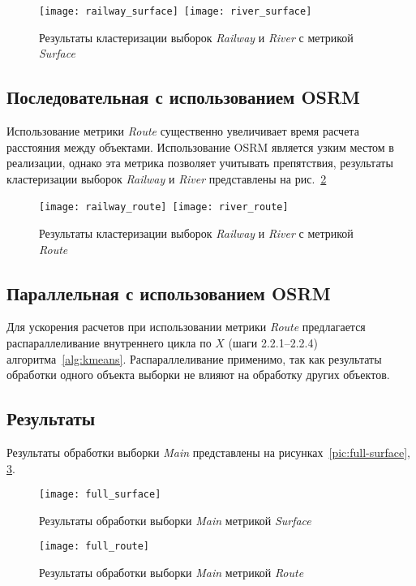 \begin{figure}[h!]
    \texttt{[image: railway\_surface]}\
    \texttt{[image: river\_surface]} \\[1ex]
    \parbox{.95\textwidth}{\caption{Результаты кластеризации выборок \emph{Railway} и \emph{River} с метрикой \emph{Surface}}\label{pic:test_surface_results}}
    \vspace*{-1ex}
\end{figure}

\subsection{Последовательная с использованием OSRM}
Использование метрики \emph{Route} существенно увеличивает время расчета расстояния между объектами. Использование OSRM является узким местом в реализации, однако эта метрика позволяет учитывать препятствия, результаты кластеризации выборок \emph{Railway} и \emph{River} представлены на рис.~\ref{pic:test_route_results}

\begin{figure}[h!]
    \texttt{[image: railway\_route]}\
    \texttt{[image: river\_route]} \\[1ex]
    \parbox{.95\textwidth}{\caption{Результаты кластеризации выборок \emph{Railway} и \emph{River} с метрикой \emph{Route}}\label{pic:test_route_results}}
    \vspace*{-1ex}
\end{figure}

\subsection{Параллельная с использованием OSRM}
Для ускорения расчетов при использовании метрики \emph{Route} предлагается распараллеливание внутреннего цикла по \( X \) (шаги 2.2.1--2.2.4) алгоритма~\ref{alg:kmeans}. Распараллеливание применимо, так как результаты обработки одного объекта выборки не влияют на обработку других объектов.

\subsection{Результаты}
Результаты обработки выборки \emph{Main} представлены на рисунках~\ref{pic:full-surface}, \ref{pic:full-route}.

\begin{figure}[h!]
    \centering
    \texttt{[image: full\_surface]}\\[1ex]
    \parbox{.95\textwidth}{\caption{Результаты обработки выборки \emph{Main} метрикой \emph{Surface}}\label{pic:full-surface}}
    \texttt{[image: full\_route]}\\[1ex]
    \parbox{.95\textwidth}{\caption{Результаты обработки выборки \emph{Main} метрикой \emph{Route}}\label{pic:full-route}}
\end{figure}

